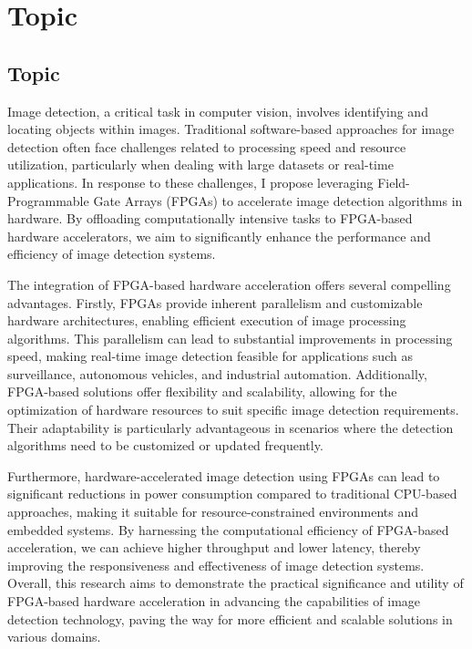\chapter[Topic]{Topic}

\label{Chap:Topic}

\section{Topic}
Image detection, a critical task in computer vision, involves identifying and locating objects within images. 
Traditional software-based approaches for image detection often face challenges related to processing speed and resource utilization, particularly when dealing with large datasets or real-time applications. In response to these challenges, I propose leveraging Field-Programmable Gate Arrays (FPGAs) to accelerate image detection algorithms in hardware. By offloading computationally intensive tasks to FPGA-based hardware accelerators, we aim to significantly enhance the performance and efficiency of image detection systems.

The integration of FPGA-based hardware acceleration offers several compelling advantages. 
Firstly, FPGAs provide inherent parallelism and customizable hardware architectures, enabling efficient execution of image processing algorithms. 
This parallelism can lead to substantial improvements in processing speed, making real-time image detection feasible for applications such as surveillance, autonomous vehicles, and industrial automation. Additionally, FPGA-based solutions offer flexibility and scalability, allowing for the optimization of hardware resources to suit specific image detection requirements. 
Their adaptability is particularly advantageous in scenarios where the detection algorithms need to be customized or updated frequently.

Furthermore, hardware-accelerated image detection using FPGAs can lead to significant reductions in power consumption compared to traditional CPU-based approaches, making it suitable for resource-constrained environments and embedded systems. 
By harnessing the computational efficiency of FPGA-based acceleration, we can achieve higher throughput and lower latency, thereby improving the responsiveness and effectiveness of image detection systems. 
Overall, this research aims to demonstrate the practical significance and utility of FPGA-based hardware acceleration in advancing the capabilities of image detection technology, paving the way for more efficient and scalable solutions in various domains.

